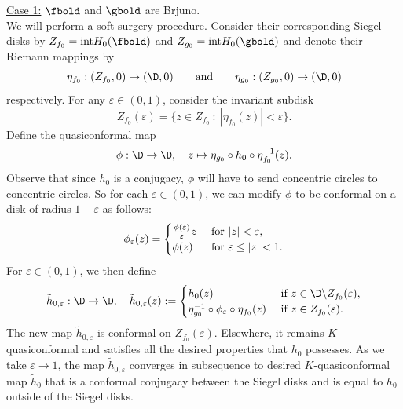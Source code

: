 \documentclass{amsart}
\begin{document}
    \noindent \underline{Case 1:} $\fbold$ and $\gbold$ are Brjuno. \\
    We will perform a soft surgery procedure. 
    Consider their corresponding Siegel disks by $Z_{f_0} = \text{int} H_0(\fbold)$ and $Z_{g_0} = \text{int} H_0(\gbold)$
    and denote their Riemann mappings by 
    \[
    \eta_{f_0}: (Z_{f_0}, 0) \to (\D,0) 
    \qquad \text{and} \qquad 
    \eta_{g_0}: (Z_{g_0}, 0) \to (\D,0)
    \]
    respectively. 
    For any $\varepsilon \in (0,1)$, consider the invariant subdisk 
    \[
    Z_{f_0}(\varepsilon) = \{ z \in Z_{f_0} \: : \: |\eta_{f_0}(z)| < \varepsilon \}.
    \]
    Define the quasiconformal map 
    \[
        \phi : \D \to \D, \quad z \mapsto \eta_{g_0} \circ h_0 \circ \eta_{f_0}^{-1}(z).
    \]
    Observe that since $h_0$ is a conjugacy, $\phi$ will have to send concentric circles to concentric circles.
    So for each $\varepsilon \in (0,1)$, we can modify $\phi$ to be conformal on a disk of radius $1-\varepsilon$ as follows:
    \[
        \phi_{\varepsilon}(z) = \begin{cases}
            \frac{\phi(\varepsilon)}{\varepsilon} z & \textnormal{ for } |z|<\varepsilon, \\
            \phi(z) & \textnormal{ for } \varepsilon \leq |z| < 1.
        \end{cases}
    \]
    For $\varepsilon \in (0,1)$, we then define 
    \[
        \tilde{h}_{0,\varepsilon} : \D \to \D, \quad 
        \tilde{h}_{0,\varepsilon} (z) :=
        \begin{cases}
            h_0(z) & \text{ if } z \in \D \backslash Z_{f_0}(\varepsilon), \\
            \eta_{g_0}^{-1} \circ \phi_{\varepsilon} \circ \eta_{f_0}(z) & \text{ if } z \in Z_{f_0}(\varepsilon).
        \end{cases}
    \]
    The new map $\tilde{h}_{0,\varepsilon}$ is conformal on $Z_{f_0}(\varepsilon)$.
    Elsewhere, it remains $K$-quasiconformal and satisfies all the desired properties that $h_0$ possesses.  
    As we take $\varepsilon \to 1$, the map $\tilde{h}_{0,\varepsilon}$ converges in subsequence to desired $K$-quasiconformal map $\tilde{h}_0$ that is a conformal conjugacy between the Siegel disks and is equal to $h_0$ outside of the Siegel disks.
    \vspace{0.1in}
    
\end{document}
